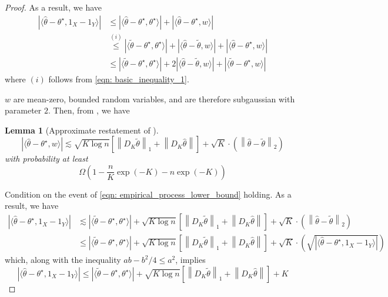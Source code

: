 \documentclass{article}
\newcommand{\norm}[1]{\left\lVert#1\right\rVert}
\newcommand{\abs}[1]{\left \lvert #1 \right \rvert}
\newcommand{\dotp}[2]{\langle #1, #2 \rangle}
\newcommand{\1}{\mathbb{I}}
\theoremstyle{alden}
\theoremstyle{aldenthm}
\newtheorem{lemma}{Lemma}
\theoremstyle{definition}
\theoremstyle{remark}
\begin{document}
\begin{proof}
	As a result, we have
	\begin{align*}
	\abs{\dotp{\widehat{\theta} - \theta^{\star}}{1_X - 1_Y}} & \leq \abs{\dotp{\widehat{\theta} - \theta^{\star}}{\theta^{\star}} } + \abs{\dotp{\widehat{\theta} - \theta^{\star}}{w} } \\
	& \overset{(i)}{\leq} \abs{\dotp{\widetilde{\theta} - \theta^{\star}}{\theta^{\star}} } + \abs{\dotp{\widehat{\theta} - \widetilde{\theta}}{w} } + \abs{\dotp{\widehat{\theta} - \theta^{\star}}{w} } \\
	& \leq \abs{\dotp{\widetilde{\theta} - \theta^{\star}}{\theta^{\star}} } + 2\abs{\dotp{\widehat{\theta} - \widetilde{\theta}}{w} } + \abs{\dotp{\widetilde{\theta} - \theta^{\star}}{w}}
	\end{align*}
	where $(i)$ follows from \eqref{eqn: basic_inequality_1}. 
	
	$w$ are mean-zero, bounded random variables, and are therefore subgaussian with parameter $2$. Then, from \citep{padilla2018}, we have
	\begin{lemma}[Approximate restatement of \citep{padilla2018}]
		\begin{equation}
		\label{eqn: empirical_process_lower_bound}
		\abs{\dotp{\widehat{\theta} - \theta^{\star}}{w}} \lesssim \sqrt{K \log n} \left[ \norm{D_K \widetilde{\theta}}_1 + \norm{D_K \widehat{\theta}} \right] + \sqrt{K} \cdot \left(\norm{\widehat{\theta} - \widetilde{\theta}}_2 \right)
		\end{equation}
		with probability at least 
		\begin{equation*}
		\Omega \left(1 - \frac{n}{K} \exp\left(-K\right) - n \exp(-K)  \right)
		\end{equation*}
	\end{lemma}
	Condition on the event of \eqref{eqn: empirical_process_lower_bound} holding. As a result, we have
	\begin{align*}
	\abs{\dotp{\widehat{\theta} - \theta^{\star}}{1_X - 1_Y}} & \lesssim  \abs{\dotp{\widetilde{\theta} - \theta^{\star}}{\theta^{\star}} } + \sqrt{K \log n} \left[ \norm{D_K \widetilde{\theta}}_1 + \norm{D_K \widehat{\theta}} \right] + \sqrt{K} \cdot \left(\norm{\widehat{\theta} - \widetilde{\theta}}_2 \right) \\
	& \leq \abs{\dotp{\widetilde{\theta} - \theta^{\star}}{\theta^{\star}} } + \sqrt{K \log n} \left[ \norm{D_K \widetilde{\theta}}_1 + \norm{D_K \widehat{\theta}} \right] + \sqrt{K} \cdot \left(\sqrt{\abs{\dotp{\widehat{\theta} - \theta^{\star}}{1_X - 1_Y}}} \right)
	\end{align*}
	which, along with the inequality $ab - b^2/4 \leq a^2$, implies
	\begin{equation*}
	\abs{\dotp{\widehat{\theta} - \theta^{\star}}{1_X - 1_Y}} \leq \abs{\dotp{\widetilde{\theta} - \theta^{\star}}{\theta^{\star}} } + \sqrt{K \log n} \left[ \norm{D_K \widetilde{\theta}}_1 + \norm{D_K \widehat{\theta}} \right] + K
	\end{equation*}
	

\end{proof}
\end{document}
